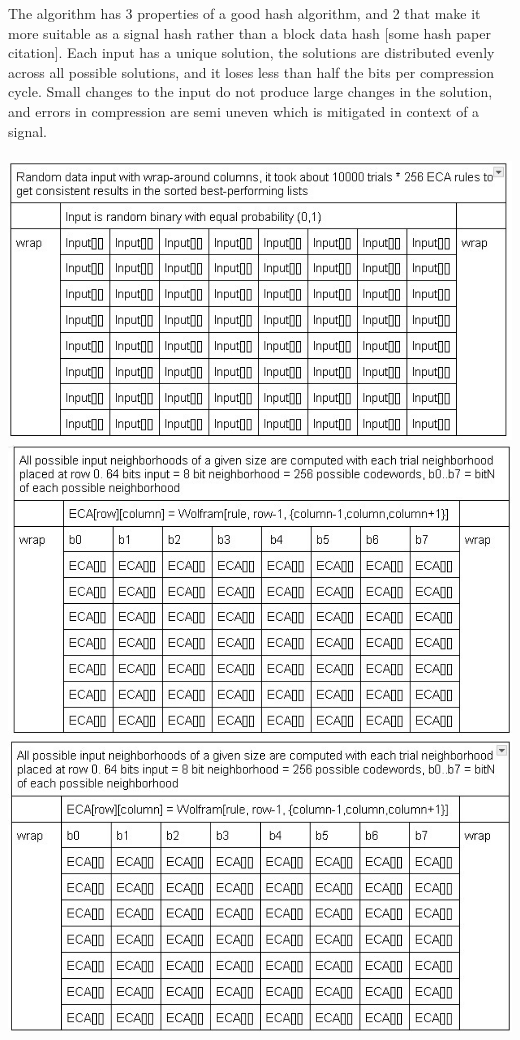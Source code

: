 \documentclass[11pt]{article}
\begin{document}
The algorithm has 3 properties of a good hash algorithm, and 2 that make it more suitable as a
signal hash rather than a block data hash [some hash paper citation]. Each input has a unique
solution, the solutions are distributed evenly across all possible solutions, and it loses less
than half the bits per compression cycle. Small changes to the input do not produce large changes
in the solution, and errors in compression are semi uneven which is mitigated in context of a signal.
\\
\\
\includegraphics{WrappedInput}\\
\includegraphics{ECAspace}\\
\includegraphics{ErrorScore}\\
\\
\end{document}

